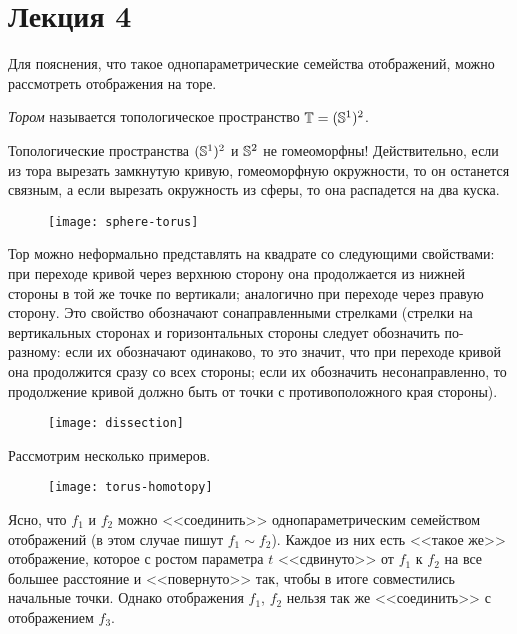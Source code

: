 \documentclass[main]{subfiles}
\begin{document}
\section{Лекция 4}

Для пояснения, что такое однопараметрические семейства отображений, можно рассмотреть отображения на торе.

\begin{definition}
	\emph{Тором} называется топологическое пространство $ \T = (\S^1)^2 $.
\end{definition}

\begin{remark}
	Топологические пространства $ (\S^1)^2 $ и $ \S^2 $ не гомеоморфны! Действительно, если из тора вырезать замкнутую
	кривую, гомеоморфную окружности, то он останется связным, а если вырезать окружность из сферы, то она распадется
	на два куска.
\end{remark}

\begin{figure}[H]
	\centering \texttt{[image: sphere-torus]}
\end{figure}

Тор можно неформально представлять на квадрате со следующими свойствами: при переходе кривой через верхнюю сторону она
продолжается из нижней стороны в той же точке по вертикали; аналогично при переходе через правую сторону. Это свойство
обозначают сонаправленными стрелками (стрелки на вертикальных сторонах и горизонтальных стороны следует обозначить
по-разному: если их обозначают одинаково, то это значит, что при переходе кривой она продолжится сразу со всех стороны;
если их обозначить несонаправленно, то продолжение кривой должно быть от точки с противоположного края стороны).

\begin{figure}[H]
	\centering \texttt{[image: dissection]}
\end{figure}

Рассмотрим несколько примеров.

\begin{figure}[H]
	\centering \texttt{[image: torus-homotopy]}
\end{figure}

Ясно, что $ f_1 $ и $ f_2 $ можно <<соединить>> однопараметрическим семейством отображений (в этом случае пишут
$ f_1 \sim f_2 $). Каждое из них есть <<такое же>> отображение, которое с ростом параметра $ t $ <<сдвинуто>> от
$ f_1 $ к $ f_2 $ на все большее расстояние и <<повернуто>> так, чтобы в итоге совместились начальные точки.
Однако отображения $ f_1 $, $ f_2 $ нельзя так же <<соединить>> с отображением $ f_3 $.
\end{document}
